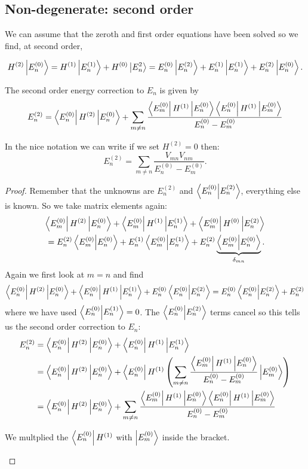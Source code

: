 \documentclass[12pt, a4paper]{article}
\begin{document}
\subsection{Non-degenerate: second order}

We can assume that the zeroth and first order equations have been solved so we find, at second order,

\[H^{(2)}\ket{E_n^{(0)}} = H^{(1)}\ket{E_n^{(1)}} +H^{(0)}\ket{E_n^{2}} =E_n^{(0)}\ket{E_n^{(2)}}+E_n^{(1)}\ket{E_n^{(1)}}+E_n^{(2)}\ket{E_n^{(0)}}.\]

\begin{mdprop}
    The second order energy correction to \(E_n\) is given by 
    \[E_n^{(2)} = \bra{E_n^{(0)}} H^{(2)} \ket{E_n^{(0)}} + \sum_{m \neq n} \frac{\bra{E_m^{(0)}} H^{(1)} \ket{E_n^{(0)}} \bra{E_n^{(0)}} H^{(1)} \ket{E_m^{(0)}}}{E_n^{(0)} - E_m^{(0)}}\]
\end{mdprop}

\begin{mdremark}
    In the nice notation we can write if we set \(H^{(2)}=0\) then:
    \[E_n^{(2)} = \sum_{m\neq n} \frac{V_{mn}V_{nm}}{E_n^{(0)}-E_m^{(0)}}.\]
\end{mdremark}

\begin{proof}
    Remember that the unknowns are \( E_n^{(2)} \) and \( \bra{E_n^{(0)}} \ket{E_n^{(2)}} \), everything else is known. So we take matrix elements again:
    \[\begin{split}
        \bra{E_m^{(0)}} H^{(2)} \ket{E_n^{(0)}} + \bra{E_m^{(0)}} H^{(1)} \ket{E_n^{(1)}} + \bra{E_m^{(0)}} H^{(0)} \ket{E_n^{(2)}} \\
        =E_n^{(2)} \bra{E_m^{(0)}} \ket{E_n^{(0)}} + E_n^{(1)} \bra{E_m^{(0)}} \ket{E_n^{(1)}} + E_n^{(2)} \underbrace{\bra{E_m^{(0)}}\ket{E_n^{(0)}}}_{\delta_{mn}}.
    \end{split}\]
    Again we first look at \( m = n \) and find
    \[\bra{E_n^{(0)}} H^{(2)} \ket{E_n^{(0)}} + \bra{E_n^{(0)}} H^{(1)} \ket{E_n^{(1)}} + E_n^{(0)} \bra{E_n^{(0)}} \ket{E_n^{(2)}} = E_n^{(0)} \bra{E_n^{(0)}} \ket{E_n^{(2)}} + E_n^{(2)}
\]
where we have used \( \bra{E_n^{(0)}} \ket{E_n^{(1)}} = 0 \). The \( \bra{E_n^{(0)}} \ket{E_n^{(2)}} \) terms cancel so this tells us the second order correction to \( E_n \):
\[\begin{aligned}
    E_n^{(2)} &= \bra{E_n^{(0)}} H^{(2)} \ket{E_n^{(0)}} + \bra{E_n^{(0)}} H^{(1)} \ket{E_n^{(1)}} \\
    &= \bra{E_n^{(0)}} H^{(2)} \ket{E_n^{(0)}} + \bra{E_n^{(0)}} H^{(1)} \left( \sum_{m \neq n} \frac{\bra{E_m^{(0)}} H^{(1)} \ket{E_n^{(0)}}}{E_n^{(0)} - E_m^{(0)}} \ket{E_m^{(0)}} \right)\\
    &= \bra{E_n^{(0)}} H^{(2)} \ket{E_n^{(0)}} + \sum_{m \neq n} \frac{\bra{E_m^{(0)}} H^{(1)} \ket{E_n^{(0)}} \bra{E_n^{(0)}} H^{(1)} \ket{E_m^{(0)}}}{E_n^{(0)} - E_m^{(0)}}
\end{aligned}\]
\begin{mdnote}
    We multplied the \(\bra{E_n^{(0)}} H^{(1)}\) with \(\ket{E_m^{(0)}}\) inside the bracket.
\end{mdnote}
\end{proof}
\end{document}
